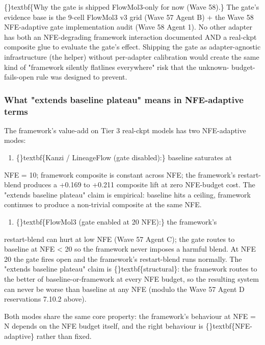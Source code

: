 \documentclass{article}
\begin{document}
\{\}textbf\{Why the gate is shipped FlowMol3-only for now (Wave 58).\} The gate's evidence base is the 9-cell FlowMol3 v3 grid (Wave 57 Agent B) + the Wave 58 NFE-adaptive gate implementation audit (Wave 58 Agent 1). No other adapter has both an NFE-degrading framework interaction documented AND a real-ckpt composite glue to evaluate the gate's effect. Shipping the gate as adapter-agnostic infrastructure (the  helper) without per-adapter calibration would create the same kind of "framework silently flatlines everywhere" risk that the unknown- budget-fails-open rule was designed to prevent.

\subsubsection{What "extends baseline plateau" means in NFE-adaptive terms}
The framework's value-add on Tier 3 real-ckpt models has two NFE-adaptive modes:

\begin{enumerate}
\item \{\}textbf\{Kanzi / LineageFlow (gate disabled):\} baseline saturates at
\end{enumerate}
NFE = 10; framework composite is constant across NFE; the framework's restart-blend produces a +0.169 to +0.211 composite lift at zero NFE-budget cost. The "extends baseline plateau" claim is empirical: baseline hits a ceiling, framework continues to produce a non-trivial composite at the same NFE.

\begin{enumerate}
\item \{\}textbf\{FlowMol3 (gate enabled at 20 NFE):\} the framework's
\end{enumerate}
restart-blend can hurt at low NFE (Wave 57 Agent C); the gate routes to baseline at NFE < 20 so the framework never imposes a harmful blend. At NFE  20 the gate fires open and the framework's restart-blend runs normally. The "extends baseline plateau" claim is \{\}textbf\{structural\}: the framework routes to the better of baseline-or-framework at every NFE budget, so the resulting system can never be worse than baseline at any NFE (modulo the Wave 57 Agent D reservations 7.10.2 above).

Both modes share the same core property: the framework's behaviour at NFE = N depends on the NFE budget itself, and the right behaviour is \{\}textbf\{NFE-adaptive\} rather than fixed.
\end{document}
